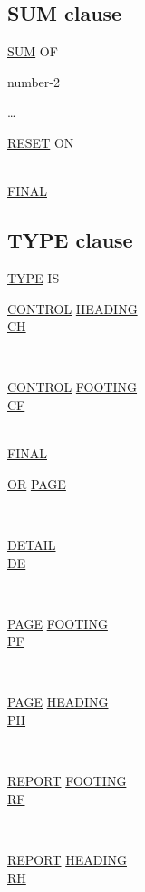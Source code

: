 \documentclass[a4paper,oneside,svgnames]{scrbook}
\makeatletter
\newcommand{\key}[1]{\underline{#1}}
\newenvironment{0-1}{$\left[ \begin{tabular}{@{}l@{}}}{\end{tabular} \right]$}
\newenvironment{1=}{$\left\{ \begin{tabular}{@{}l@{}}}{\end{tabular} \right\}$}
\makeatother
\begin{document}
\subsection{SUM clause}
\key{SUM} OF
\begin{1=}
  number-2
\end{1=}\ldots
\begin{0-1}
  \key{RESET} ON
  \begin{1=}
    \identifier \\
    \key{FINAL}
  \end{1=}
\end{0-1}

\subsection{TYPE clause}
\key{TYPE} IS
\begin{1=}
  \begin{1=}
    \begin{1=}
      \key{CONTROL} \key{HEADING} \\
      \key{CH}
    \end{1=} \\
    \begin{1=}
      \key{CONTROL} \key{FOOTING} \\
      \key{CF}
    \end{1=}
  \end{1=}
  \begin{1=}
    \identifier \\
    \key{FINAL}
  \end{1=}
  \begin{0-1}
    \key{OR} \key{PAGE}
  \end{0-1} \\

  \begin{1=}
    \key{DETAIL} \\
    \key{DE}
  \end{1=} \\

  \begin{1=}
    \key{PAGE} \key{FOOTING} \\
    \key{PF}
  \end{1=} \\

  \begin{1=}
    \key{PAGE} \key{HEADING} \\
    \key{PH}
  \end{1=} \\

  \begin{1=}
    \key{REPORT} \key{FOOTING} \\
    \key{RF}
  \end{1=} \\

  \begin{1=}
    \key{REPORT} \key{HEADING} \\
    \key{RH}
  \end{1=}
\end{1=}
\end{document}
